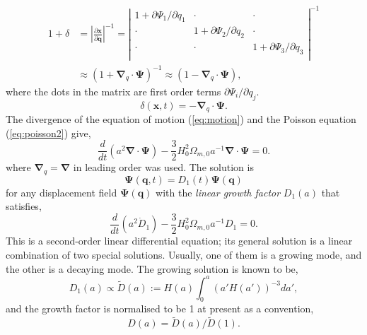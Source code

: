 \documentclass[a4paper]{article}
\begin{document}
\begin{align}
  1 + \delta
    &= \left| \frac{\partial \bm{x}}{\partial \bm{q}} \right|^{-1}
     = \left|
         \begin{array}{ccc}
           1 + \partial \Psi_1/\partial q_1 & \cdot & \cdot  \\
           \cdot &  1 + \partial \Psi_2/\partial q_2 & \cdot \\
          \cdot &  \cdot & 1 + \partial \Psi_3/\partial q_3 \\
         \end{array}
       \right|^{-1}\\
       &\approx (1 + \bm{\nabla}_q \cdot \bm{\Psi})^{-1}
       \approx (1 - \bm{\nabla}_q \cdot \bm{\Psi}),
\end{align}
where the dots in the matrix are first order terms $\partial
\Psi_i/\partial q_j$.
\begin{equation}
  \delta(\bm{x}, t) = - \bm{\nabla}_q \cdot \bm{\Psi}.
\end{equation}
The divergence of the equation of motion (\ref{eq:motion}) and the
Poisson equation (\ref{eq:poisson2}) give,
\begin{equation}
  \frac{d}{dt} \left( a^2 \bm{\nabla}\cdot\bm{\Psi} \right)
  - \frac{3}{2} H_0^2 \Omega_{m,0} a^{-1} \bm{\nabla}\cdot\bm{\Psi} = 0.
\end{equation}
where $\bm{\nabla}_q = \bm{\nabla}$ in leading order was used.
The solution is
\begin{equation}
  \bm{\Psi}(\bm{q}, t) = D_1(t) \bm{\Psi}(\bm{q})
\end{equation}
for any displacement field $\bm{\Psi}(\bm{q})$ with the \textit{linear growth factor} $D_1(a)$ that satisfies,
\begin{equation}
  \label{eq:linear-growth-factor}
  \frac{d}{dt}\left( a^2 \dot{D}_1 \right)
  - \frac{3}{2} H_0^2 \Omega_{m,0} a^{-1} D_1 = 0.
\end{equation}
This is a second-order linear differential equation; its general
solution is a linear combination of two special solutions. Usually,
one of them is a growing mode, and the other is a decaying mode. The
growing solution is known to be,
\begin{equation}
  D_1(a) \propto \tilde{D}(a) := H(a) \int_0^a \left( a'H(a') \right)^{-3} da',
\end{equation}
and the growth factor is normalised to be 1 at present as a convention,
\begin{equation}
  D(a) = \tilde{D}(a)/\tilde{D}(1).
\end{equation}
\end{document}
